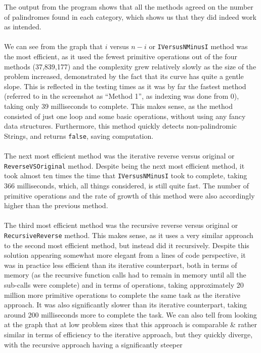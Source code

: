 \documentclass[a4paper]{article}
\begin{document}
The output from the program shows that all the methods agreed on the number of palindromes found in each category, which shows us 
that they did indeed work as intended. 
\\\\
We can see from the graph that $i$ versus $n-i$ or \verb|IVersusNMinusI| method was the most efficient, as it used the fewest 
primitive operations out of the four methods (37,839,177) and the complexity grew relatively slowly as the size of the problem increased, 
demonstrated by the fact that its curve has quite a gentle slope.
This is reflected in the testing times as it was by far the fastest method (referred to in the screenshot as ``Method 1'', as 
indexing was done from 0), taking only 39 milliseconds to complete. 
This makes sense, as the method consisted of just one loop and some basic operations, without using any fancy data structures. 
Furthermore, this method quickly detects non-palindromic Strings, and returns \verb|false|, saving computation.
\\\\
The next most efficient method was the iterative reverse versus original or \verb|ReverseVSOriginal| method.
Despite being the next most efficient method, it took almost ten times the time that \verb|IVersusNMinusI| took to complete, taking 366 
milliseconds, which, all things considered, is still quite fast.
The number of primitive operations and the rate of growth of this method were also accordingly higher than the previous method.
\\\\
The third most efficient method was the recursive reverse versus original or \verb|RecursiveReverse| method. 
This makes sense, as it uses a very similar approach to the second most efficient method, but instead did it recursively. 
Despite this solution appearing somewhat more elegant from a lines of code perspective, it was in practice less efficient than 
its iterative counterpart, both in terms of memory (as the recursive function calls had to remain in memory until all the sub-calls 
were complete) and in terms of operations, taking approximately 20 million more primitive operations to complete the same task 
as the iterative approach.
It was also significantly slower than its iterative counterpart, taking around 200 milliseconds more to complete the task.
We can also tell from looking at the graph that at low problem sizes that this approach is comparable \& rather similar in terms 
of efficiency to the iterative approach, but they quickly diverge, with the recursive approach having a significantly steeper 
\end{document}
